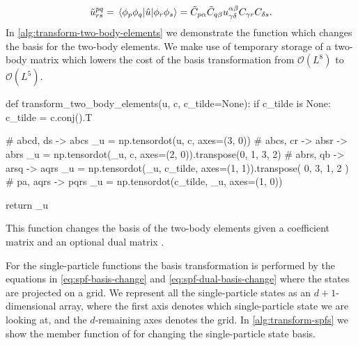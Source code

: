         \begin{align}
            \tilde{u}^{pq}_{rs}
            = \mel*{\phi_p\phi_q}{
                \hat{u}
            }{\phi_r\phi_s}
            = \tilde{C}_{p\alpha}
            \tilde{C}_{q\beta}
            u^{\alpha\beta}_{\gamma\delta}
            C_{\gamma r}
            C_{\delta s}.
        \end{align}
        In \autoref{alg:transform-two-body-elements} we demonstrate the function
        which changes the basis for the two-body elements.
        We make use of temporary storage of a two-body matrix  which
        lowers the cost of the basis transformation from $\mathcal{O}(L^8)$ to
        $\mathcal{O}(L^5)$.
        \begin{algorithm}
            \begin{python}
def transform_two_body_elements(u, c, c_tilde=None):
    if c_tilde is None:
        c_tilde = c.conj().T

    # abcd, ds -> abcs
    _u = np.tensordot(u, c, axes=(3, 0))
    # abcs, cr -> absr -> abrs
    _u = np.tensordot(_u, c, axes=(2, 0)).transpose(0, 1, 3, 2)
    # abrs, qb -> arsq -> aqrs
    _u = np.tensordot(_u, c_tilde, axes=(1, 1)).transpose(
        0, 3, 1, 2
    )
    # pa, aqrs -> pqrs
    _u = np.tensordot(c_tilde, _u, axes=(1, 0))

    return _u
            \end{python}
            \caption{This function changes the basis of the two-body elements
            given a coefficient matrix  and an optional dual matrix
            .}
            \label{alg:transform-two-body-elements}
        \end{algorithm}
        For the single-particle functions the basis transformation is performed
        by the equations in \autoref{eq:spf-basis-change} and
        \autoref{eq:spf-dual-basis-change} where the states are projected on a
        grid.
        We represent all the single-particle states as an $d + 1$-dimensional
        array, where the first axis denotes which single-particle state we are
        looking at, and the $d$-remaining axes denotes the grid.
        In \autoref{alg:transform-spfs} we show the member function of
         for changing the single-particle state basis.
